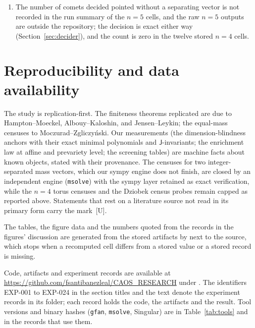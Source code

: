 \documentclass[11pt]{article}
\theoremstyle{definition}
\theoremstyle{remark}
\newcommand{\mk}[1]{\,{\scriptsize[#1]}}
\newcommand{\Um}{\mk{U}}
\begin{document}
\begin{enumerate}
review device, so the failure widths of the record could not be re-checked. The quadruple corner is not closed: the part of the region below the lower bound $t_t=1/2$ of m2w with $c_s<1/32$ lies in no chart's covered domain, the band that m2w discards contains an uncovered sliver, and the
charts to which the rest is delegated are unprocessed; m2w itself is sound and reproduces. The figure of the atlas uses only runs that are complete with zero failures.
\item The number of comets decided pointed without a separating vector is not recorded in the run summary of the $n=5$ cells, and the raw $n=5$ outputs are outside the repository; the decision is exact either way
(Section~\ref{sec:decider}), and the count is zero in the twelve stored $n=4$ cells.
\end{enumerate}

\section{Reproducibility and data availability}\label{sec:repro}

The study is replication-first. The finiteness theorems replicated are due
to Hampton--Moeckel, Albouy--Kaloshin, and Jensen--Leykin; the equal-mass
censuses to Moczurad--Zgliczy\'nski. Our measurements (the dimension-blindness
anchors with their exact minimal polynomials and $\mathsf J$-invariants; the
enrichment law at affine and prevariety level; the screening tables) are
machine facts about known objects, stated with their provenance. The
censuses for two integer-separated mass vectors, which our sympy engine does not
finish, are closed by an independent engine (\texttt{msolve}) with
the sympy layer retained as exact verification, while the $n=4$ torus censuses
and the Dziobek census probes remain capped as reported above. Statements that rest on
a literature source not read in its primary form carry the mark \Um.

The tables, the figure data and the numbers quoted from the records in the figures' discussion are generated from the stored
artifacts by  next to the source, which
stops when a recomputed cell differs from a stored value or a stored record is missing.

{\raggedright
Code, artifacts and experiment records are available at
\url{https://github.com/fsantibanezleal/CAOS_RESEARCH} under
. The identifiers
EXP-001 to EXP-024 in the section titles and the text denote the experiment
records in its  folder; each record holds the code, the
artifacts and the result. Tool
versions and binary hashes (\texttt{gfan}, \texttt{msolve}, Singular) are
in Table~\ref{tab:tools} and in the records that use them.\par}
\end{document}
